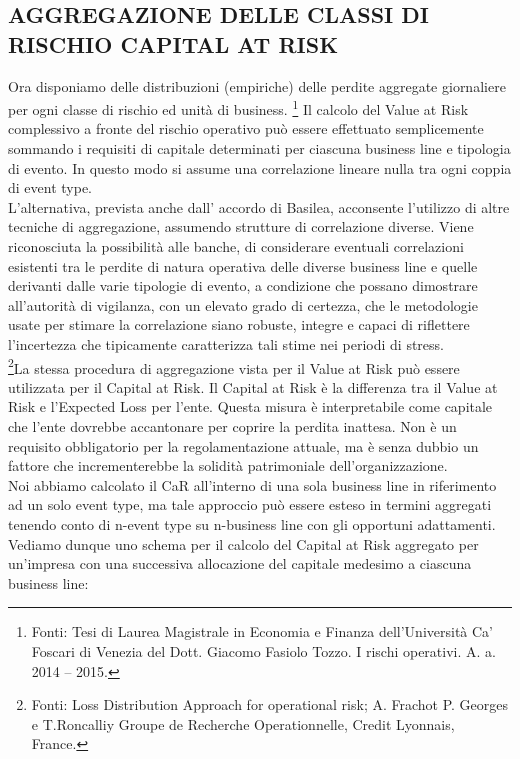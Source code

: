 \documentclass[titlepage]{article}
\begin{document}
\begin{itemize}
\section{AGGREGAZIONE DELLE CLASSI DI RISCHIO CAPITAL AT RISK}
Ora disponiamo delle distribuzioni (empiriche) delle perdite aggregate giornaliere per ogni classe di rischio ed unità di business. \footnote{Fonti: Tesi di Laurea Magistrale in Economia e Finanza dell’Università Ca’ Foscari di Venezia del Dott. Giacomo Fasiolo Tozzo. I rischi operativi. A. a. 2014 – 2015.} Il calcolo del Value at Risk complessivo a fronte del rischio operativo può essere effettuato semplicemente sommando i requisiti di capitale determinati per ciascuna business line e tipologia di evento. In questo modo si assume una correlazione lineare nulla tra ogni coppia di event type.\\

L’alternativa, prevista anche dall’ accordo di Basilea, acconsente l’utilizzo di altre tecniche di aggregazione, assumendo strutture di correlazione diverse. Viene riconosciuta la possibilità alle banche, di considerare eventuali correlazioni esistenti tra le perdite di natura operativa delle diverse business line e quelle derivanti dalle varie tipologie di evento, a condizione che possano dimostrare all’autorità di vigilanza, con un elevato grado di certezza, che le metodologie usate per stimare la correlazione siano robuste, integre e capaci di riflettere l’incertezza che tipicamente caratterizza tali stime nei periodi di stress.
\\
\footnote{Fonti: Loss Distribution Approach for operational risk; A. Frachot P. Georges e T.Roncalliy Groupe de Recherche Operationnelle, Credit Lyonnais, France.}La stessa procedura di aggregazione vista per il Value at Risk può essere utilizzata per il Capital at Risk. Il Capital at Risk è la differenza tra il Value at Risk e l’Expected Loss per l’ente. Questa misura è interpretabile come capitale che l’ente dovrebbe accantonare per coprire la perdita inattesa. Non è un requisito obbligatorio per la regolamentazione attuale, ma è senza dubbio un fattore che incrementerebbe la solidità patrimoniale dell’organizzazione.
\\
Noi abbiamo calcolato il CaR all’interno di una sola business line in riferimento ad un solo event type, ma tale approccio può essere esteso in termini aggregati tenendo conto di n-event type su n-business line con gli opportuni adattamenti. 
Vediamo dunque uno schema per il calcolo del Capital at Risk aggregato per un’impresa con una successiva allocazione del capitale medesimo a ciascuna business line:
\begin{itemize}



\end{itemize}
\end{itemize}
\end{document}
